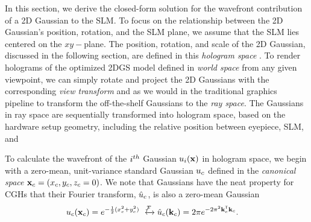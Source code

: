 \label{subsec:gaussian-wave-splatting} %
In this section, we derive the closed-form solution for the wavefront contribution of a 2D Gaussian to the SLM. To focus on the relationship between the 2D Gaussian's position, rotation, and the SLM plane, we assume that the SLM lies centered on the $xy-$plane. The position, rotation, and scale of the 2D Gaussian, discussed in the following section, are defined in this \textit{hologram space} . To render holograms of the optimized 2DGS model defined in \textit{world space} from any given viewpoint, we can simply rotate and project the 2D Gaussians with the corresponding \textit{view transform} and \textit{} as we would in the traditional graphics pipeline to transform the off-the-shelf Gaussians to the \textit{ray space}. The Gaussians in ray space are sequentially transformed into hologram space, based on the hardware setup geometry, including the relative position between eyepiece, SLM, and 

To calculate the wavefront of the $i^{th}$ Gaussian $u_i(\mathbf{x})$ in hologram space, we begin with a zero-mean, unit-variance standard Gaussian $u_c$ defined in the \textit{canonical space} $\mathbf{x}_c = (x_c, y_c, \textcolor{black}{z_c = 0})$. We note that Gaussians have the neat property for CGHs that their Fourier transform, $\hat{u}_c$, is also a zero-mean Gaussian
\begin{align}
u_\canonicalspace(\coordinate_\canonicalspace) =e^{-\frac{1}{2}(x_\canonicalspace^2 + y_\canonicalspace^2)} & \xleftrightarrow{\fourier} \angularspectrum_\canonicalspace(\mathbf{k}_\canonicalspace) = 2 \pi e^{-2\pi^2 \mathbf{k}_\canonicalspace^\mathsf{T} \mathbf{k}_\canonicalspace}.\label{eq:ref_gaussian}  
\end{align}

